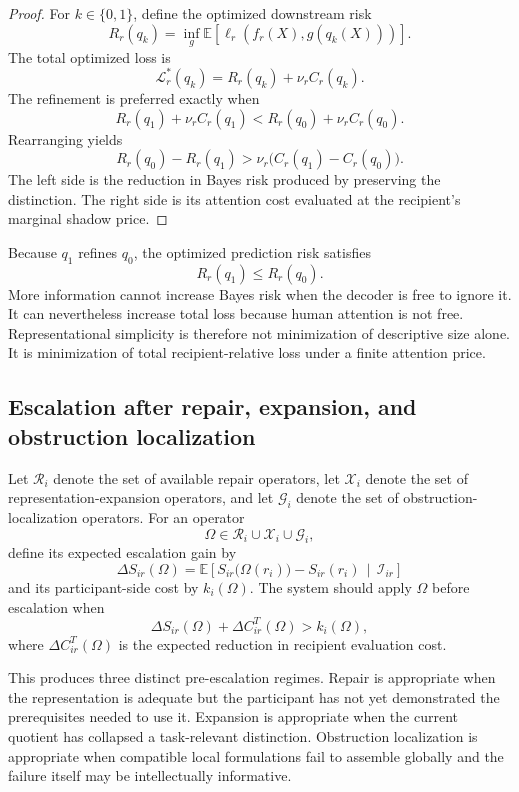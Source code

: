\documentclass[11pt]{article}
\theoremstyle{definition}
\newcommand{\E}{\mathbb{E}}
\newcommand{\given}{\,\middle|\,}
\begin{document}
\begin{proof}
For \(k\in\{0,1\}\), define the optimized downstream risk
\[
R_r(q_k)
=
\inf_{g}
\E\!\left[
\ell_r(f_r(X),g(q_k(X)))
\right].
\]
The total optimized loss is
\[
\mathcal{L}_r^{*}(q_k)
=
R_r(q_k)+\nu_r C_r(q_k).
\]
The refinement is preferred exactly when
\[
R_r(q_1)+\nu_r C_r(q_1)
<
R_r(q_0)+\nu_r C_r(q_0).
\]
Rearranging yields
\[
R_r(q_0)-R_r(q_1)
>
\nu_r\bigl(C_r(q_1)-C_r(q_0)\bigr).
\]
The left side is the reduction in Bayes risk produced by preserving the distinction. The right side is its attention cost evaluated at the recipient's marginal shadow price.
\end{proof}

Because \(q_1\) refines \(q_0\), the optimized prediction risk satisfies
\[
R_r(q_1)\leq R_r(q_0).
\]
More information cannot increase Bayes risk when the decoder is free to ignore it. It can nevertheless increase total loss because human attention is not free. Representational simplicity is therefore not minimization of descriptive size alone. It is minimization of total recipient-relative loss under a finite attention price.

\subsection{Escalation after repair, expansion, and obstruction localization}

Let \(\mathcal{R}_i\) denote the set of available repair operators, let \(\mathcal{X}_i\) denote the set of representation-expansion operators, and let \(\mathcal{G}_i\) denote the set of obstruction-localization operators. For an operator
\[
\Omega\in
\mathcal{R}_i\cup\mathcal{X}_i\cup\mathcal{G}_i,
\]
define its expected escalation gain by
\[
\Delta S_{ir}(\Omega)
=
\E\!\left[
S_{ir}\bigl(\Omega(r_i)\bigr)-S_{ir}(r_i)
\given
\mathscr{I}_{ir}
\right]
\]
and its participant-side cost by \(k_i(\Omega)\). The system should apply \(\Omega\) before escalation when
\[
\Delta S_{ir}(\Omega)
+
\Delta C_{ir}^{T}(\Omega)
>
k_i(\Omega),
\]
where \(\Delta C_{ir}^{T}(\Omega)\) is the expected reduction in recipient evaluation cost.

This produces three distinct pre-escalation regimes. Repair is appropriate when the representation is adequate but the participant has not yet demonstrated the prerequisites needed to use it. Expansion is appropriate when the current quotient has collapsed a task-relevant distinction. Obstruction localization is appropriate when compatible local formulations fail to assemble globally and the failure itself may be intellectually informative.
\end{document}
